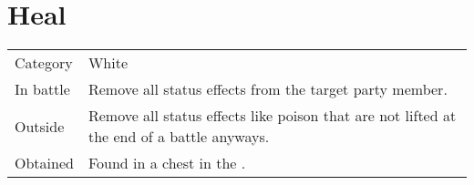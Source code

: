 \section{Heal}
\label{spell:heal}


\noindent\begin{tabularx}{\textwidth}[l]{lX}
	Category
	& White
\\
	In battle
	& Remove all status effects from the target party member.
\\
	Outside
	& Remove all status effects like poison that are not lifted at the end of a battle anyways.
\\
	Obtained
	& Found in a chest in the \nameref{map:falls_basin}.
\end{tabularx}
